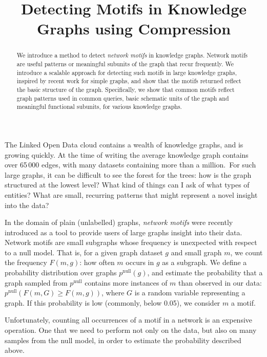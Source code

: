 \documentclass[11pt]{article}
\title{Detecting Motifs in Knowledge Graphs using Compression}
\begin{document}
\maketitle

\begin{abstract}
\noindent We introduce a method to detect \emph{network motifs} in knowledge graphs. Network motifs are useful patterns or meaningful subunits of the graph that recur frequently. We introduce a scalable approach for detecting such motifs in large knowledge graphs, inspired by recent work for simple graphs, and show that the motifs returned reflect the basic structure of the graph. Specifically, we show that common motifs reflect graph patterns used in common queries, basic schematic units of the graph and meaningful functional subunits, for various knowledge graphs.
\end{abstract}

\noindent The Linked Open Data cloud contains a wealth of knowledge graphs, and is growing quickly. At the time of writing the average knowledge graph contains over 65\,000 edges, with many datasets containing more than a million.\footnotemark~For such large graphs, it can be difficult to see the forest for the trees: how is the graph structured at the lowest level? What kind of things can I ask of what types of entities? What are small, recurring patterns that might represent a novel insight into the data?


In the domain of plain (unlabelled) graphs, \emph{network motifs} \cite{milo2002network} were recently introduced as a tool to provide users of large graphs insight into their data. Network motifs are small subgraphs whose frequency is unexpected with respect to a null model. That is, for a given graph dataset $g$ and small graph $m$, we count the frequency $F(m, g)$: how often $m$ occurs in $g$ as a subgraph. We define a probability distribution over graphs $p^\text{null}(g)$, and estimate the probability that a graph sampled from $p^\text{null}$ contains more instances of $m$ than observed in our data: $p^\text{null}(F(m, G) \geq F(m, g))$, where $G$ is a random variable representing a graph. If this probability is low (commonly, below 0.05), we consider $m$ a motif. \footnotemark

Unfortunately, counting all occurrences of a motif in a network is an expensive operation. One that we need to perform not only on the data, but also on many samples from the null model, in order to estimate the probability described above.
\end{document}
